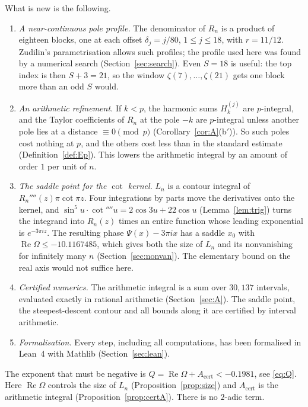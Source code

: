 \documentclass[11pt]{amsart}
\theoremstyle{definition}
\theoremstyle{remark}
\numberwithin{equation}{section}
\newcommand{\Acert}{A_{\mathrm{cert}}}
\renewcommand{\Re}{\operatorname{Re}}
\begin{document}
What is new is the following.
\begin{enumerate}
\item \emph{A near-continuous pole profile.} The denominator of $R_n$ is a product of eighteen blocks, one at
  each offset $\delta_j=j/80$, $1\le j\le18$, with $r=11/12$. Zudilin's parametrisation allows such profiles; the
  profile used here was found by a numerical search (Section~\ref{sec:search}). Even $S=18$ is useful: the top
  index is then $S+3=21$, so the window $\zeta(7),\dots,\zeta(21)$ gets one block more than an odd $S$ would.
\item \emph{An arithmetic refinement.} If $k<p$, the harmonic sums $H_k^{(j)}$ are $p$-integral, and the
  Taylor coefficients of $R_n$ at the pole $-k$ are $p$-integral unless another pole lies at a distance
  $\equiv0\pmod p$ (Corollary~\ref{cor:A}(b$'$)). So such poles cost nothing at $p$, and the others cost less
  than in the standard estimate (Definition~\ref{def:Ep}). This lowers the arithmetic integral by an amount of
  order $1$ per unit of $n$.
\item \emph{The saddle point for the $\cot$ kernel.} $L_n$ is a contour integral of $R_n''''(z)\pi\cot\pi z$.
  Four integrations by parts move the derivatives onto the kernel, and
  $\sin^5u\cdot\cot''''u=2\cos3u+22\cos u$ (Lemma~\ref{lem:trig}) turns the integrand into $R_n(z)$ times an
  entire function whose leading exponential is $e^{-3\pi iz}$. The resulting phase $\Psi(x)-3\pi ix$ has a
  saddle $x_0$ with $\Re\Omega\le-10.1167485$, which gives both the size of $L_n$ and its nonvanishing for
  infinitely many $n$ (Section~\ref{sec:nonvan}). The elementary bound on the real axis would not suffice here.
\item \emph{Certified numerics.} The arithmetic integral is a sum over $30{,}137$ intervals, evaluated exactly in
  rational arithmetic (Section~\ref{sec:A}). The saddle point, the steepest-descent contour and all bounds along it
  are certified by interval arithmetic.
\item \emph{Formalisation.} Every step, including all computations, has been formalised in Lean~4
  \cite{LeanFour} with Mathlib \cite{Mathlib} (Section~\ref{sec:lean}).
\end{enumerate}
The exponent that must be negative is $Q=\Re\Omega+\Acert<-0.1981$, see \eqref{eq:Q}. Here $\Re\Omega$
controls the size of $L_n$ (Proposition~\ref{prop:size}) and $\Acert$ is the arithmetic integral
(Proposition~\ref{prop:certA}). There is no $2$-adic term.
\end{document}

